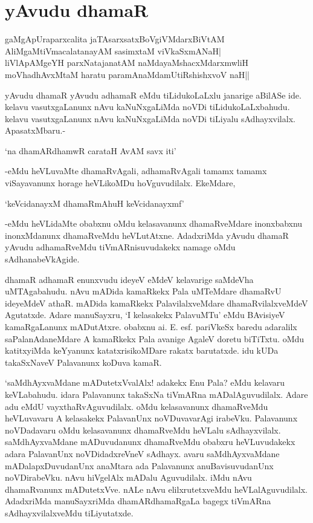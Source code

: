 \chapter{yAvudu dhamaR}

\begin{shloka}
gaMgApUraparxcalita jaTAsarxsatxBoVgiVMdarxBiVtAM\\
AliMgaMtiVmacalatanayAM sasimxtaM viVkaSxmANaH|\\
liVlApAMgeYH parxNatajanatAM naMdayaMshacxMdarxmwliH\\
moVhadhAvxMtaM haratu paramAnaMdamUtiRshishxvoV naH||
\end{shloka}

yAvudu dhamaR yAvudu adhamaR eMdu tiLidukoLaLxlu janarige aBilASe ide. kelavu vasutxgaLanunx nAvu kaNuNxgaLiMda noVDi tiLidukoLaLxbahudu. kelavu vasutxgaLanunx nAvu kaNuNxgaLiMda noVDi tiLiyalu sAdhayxvilalx. ApasatxMbaru.-

\begin{shloka}
`na dhamARdhamwR carataH AvAM savx iti'
\end{shloka}

-eMdu heVLuvaMte dhamaRvAgali, adhamaRvAgali tamamx tamamx viSayavanunx horage heVLikoMDu hoVguvudilalx. EkeMdare,

\begin{shloka}
`keVcidanayxM dhamaRmAhuH keVcidanayxmf'
\end{shloka}

-eMdu heVLidaMte obabxnu oMdu kelasavanunx dhamaRveMdare inonxbabxnu inonxMdanunx dhamaRveMdu heVLutAtxne. AdadxriMda yAvudu dhamaR yAvudu adhamaRveMdu tiVmARnisuvudakekx namage oMdu sAdhanabeVkAgide.

dhamaR adhamaR enunxvudu ideyeV eMdeV kelavarige saMdeVha uMTAgabahudu. nAvu mADida kamaRkekx Pala uMTeMdare dhamaRvU ideyeMdeV athaR. mADida kamaRkekx PalavilalxveMdare dhamaRvilalxveMdeV Agutatxde. Adare manuSayxru, `I kelasakekx PalavuMTu' eMdu BAvisiyeV kamaRgaLanunx mADutAtxre. obabxnu ai. E. esf. pariVkeSx baredu adaralilx saPalanAdaneMdare A kamaRkekx Pala avanige AgaleV doretu biTiTxtu. oMdu katitxyiMda keYyanunx katatxrisikoMDare rakatx barutatxde. idu kUDa takaSxNaveV Palavanunx koDuva kamaR. 

`saMdhAyxvaMdane mADutetxVvalAlx! adakekx Enu Pala? eMdu kelavaru keVLabahudu. idara Palavanunx takaSxNa tiVmARna mADalAguvudilalx. Adare adu eMdU vayxthaRvAguvudilalx. oMdu kelasavanunx dhamaRveMdu heVLuvavaru A kelasakekx PalavanUnx noVDuvavarAgi irabeVku. Palavanunx noVDadavaru oMdu kelasavanunx dhamaRveMdu heVLalu sAdhayxvilalx. saMdhAyxvaMdane mADuvudanunx dhamaRveMdu obabxru heVLuvudakekx adara PalavanUnx noVDidadxreVneV sAdhayx. avaru saMdhAyxvaMdane mADalapxDuvudanUnx anaMtara ada Palavanunx anuBavisuvudanUnx noVDirabeVku. nAvu hiVgelAlx mADalu Aguvudilalx. iMdu nAvu dhamaRvanunx mADutetxVve. nALe nAvu elilxrutetxveMdu heVLalAguvudilalx. AdadxriMda manuSayxriMda dhamARdhamaRgaLa bagegx tiVmARna sAdhayxvilalxveMdu tiLiyutatxde.


